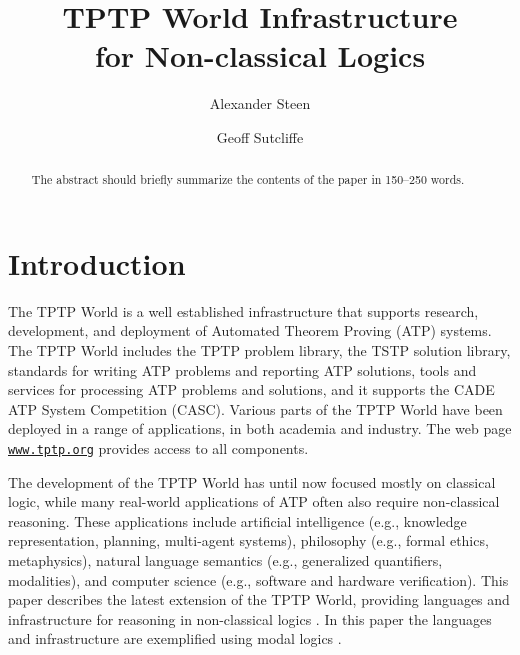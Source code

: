 \documentclass[runningheads]{llncs}
\begin{document}
\title{TPTP World Infrastructure \\ for Non-classical Logics}

\author{Alexander Steen 
\and
Geoff Sutcliffe}

\maketitle
\begin{abstract}
The abstract should briefly summarize the contents of the paper in
150--250 words.

\end{abstract}
\section{Introduction}
\label{Introduction}

The TPTP World \cite{Sut17} is a well established infrastructure that supports research, 
development, and deployment of Automated Theorem Proving (ATP) systems.
The TPTP World includes the TPTP problem library,
the TSTP solution library,
standards for writing ATP problems and reporting ATP solutions,
tools and services for processing ATP problems and solutions,
and it supports the CADE ATP System Competition (CASC).
Various parts of the TPTP World have been deployed in a range of applications,
in both academia and industry.
The web page \href{https://www.tptp.org}{\tt www.tptp.org} provides access to all 
components.

The development of the TPTP World has until now focused mostly on classical logic, while many 
real-world applications of ATP often also require non-classical reasoning. 
These applications include artificial intelligence (e.g., knowledge representation, planning, 
multi-agent systems), philosophy (e.g., formal ethics, metaphysics), natural language semantics 
(e.g., generalized quantifiers, modalities), and computer science (e.g., software and hardware 
verification).
This paper describes the latest extension of the TPTP World, providing languages and
infrastructure for reasoning in non-classical logics \cite{Pri08,Gob01}.
In this paper the languages and infrastructure are exemplified using modal logics \cite{BBW06}.
\end{document}
